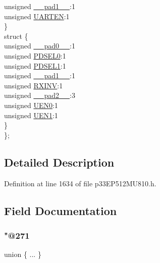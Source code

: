 \begin{DoxyCompactItemize}
\begin{tabbing}
\>\>unsigned \hyperlink{structtag_u1_m_o_d_e_b_i_t_s_acaf2d0924a107ec6e8d2e31febaf66f9}{\_\_pad1\_\_}:1\\
\>\>unsigned \hyperlink{structtag_u1_m_o_d_e_b_i_t_s_a71c27a2a2a21a1e41f5d969caaedc4ce}{UARTEN}:1\\
\>\} \\
\>struct \{\\
\>\>unsigned \hyperlink{structtag_u1_m_o_d_e_b_i_t_s_adf71f3d8410c1f1dbbc96680a92c49af}{\_\_pad0\_\_}:1\\
\>\>unsigned \hyperlink{structtag_u1_m_o_d_e_b_i_t_s_a3b06981d12ef9472672b5afa3fcb1096}{PDSEL0}:1\\
\>\>unsigned \hyperlink{structtag_u1_m_o_d_e_b_i_t_s_abd9cead9920f08c4dffa97b0c9210cbc}{PDSEL1}:1\\
\>\>unsigned \hyperlink{structtag_u1_m_o_d_e_b_i_t_s_acaf2d0924a107ec6e8d2e31febaf66f9}{\_\_pad1\_\_}:1\\
\>\>unsigned \hyperlink{structtag_u1_m_o_d_e_b_i_t_s_a53e5f9028d2bcb77dfd7b2cdb49809fe}{RXINV}:1\\
\>\>unsigned \hyperlink{structtag_u1_m_o_d_e_b_i_t_s_a4d97cc5f7d51d22fc2bf3eab35c9cb7f}{\_\_pad2\_\_}:3\\
\>\>unsigned \hyperlink{structtag_u1_m_o_d_e_b_i_t_s_acdbd7f8b51f26e512915a94d8d8f6c0d}{UEN0}:1\\
\>\>unsigned \hyperlink{structtag_u1_m_o_d_e_b_i_t_s_ab3c4d77b59c26a79b60548ef7ea7fd38}{UEN1}:1\\
\>\} \\
\}; \\

\end{tabbing}\end{DoxyCompactItemize}


\subsection{Detailed Description}


Definition at line 1634 of file p33\+E\+P512\+M\+U810.\+h.



\subsection{Field Documentation}
\mbox{\label{structtag_u1_m_o_d_e_b_i_t_s_a4f7423426eb449c8fb17585f82628882}} 
\subsubsection{\texorpdfstring{"@271}{@271}}
{\footnotesize\ttfamily union \{ ... \} }

